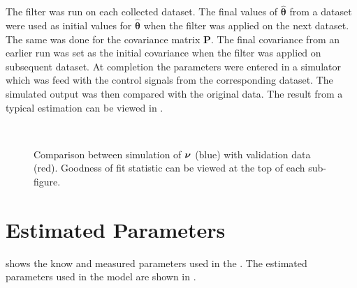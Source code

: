 The filter was run on each collected dataset. The final values of $\hat{\boldsymbol{\theta}}$ from a dataset were used as initial values for $\hat{\boldsymbol{\theta}}$ when the filter was applied on the next dataset. The same was done for the covariance matrix $\boldsymbol{P}$. The final covariance from an earlier run was set as the initial covariance when the filter was applied on subsequent dataset. At completion the parameters were entered in a simulator which was feed with the control signals from the corresponding dataset. The simulated  output was then compared with the original data. The result from a typical estimation can be viewed in .
\begin{figure}[tbp]
  \centering
  \qquad
  \\
  \caption{\label{fig:KalmanCompare}%
    Comparison between simulation of $\boldsymbol{\nu}$ (blue) with validation data (red). Goodness of fit statistic can be viewed at the top of each sub-figure.}
\end{figure}





\section{Estimated Parameters}
 shows the know and measured parameters used in the \abbrROV. The estimated parameters used in the \abbrROV model are shown in .

